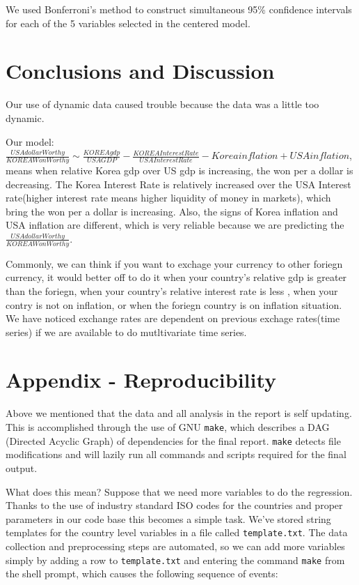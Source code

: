 \documentclass[12pt]{article}
\begin{document}
We used Bonferroni's method to construct simultaneous 95\% confidence intervals
for each of the 5 variables selected in the centered model.

\section{Conclusions and Discussion}

Our use of dynamic data caused trouble because the data was a little too
dynamic.

Our model: $\frac{USA dollar Worthy}{KOREA Won Worthy} \sim \frac{KOREA gdp}{USA GDP} - \frac{KOREA Interest Rate}{USA Interest Rate} -  Korea inflation + USA inflation$, means when relative Korea gdp over US gdp is increasing, the won per a dollar is decreasing. The Korea Interest Rate is relatively increased over the USA Interest rate(higher interest rate means higher liquidity of money in markets), which bring the won per a dollar is increasing. Also, the signs of Korea inflation and USA inflation are different, which is very reliable because we are predicting the $\frac{USA dollar Worthy}{KOREA Won Worthy}$.

Commonly, we can think if you want to exchage your currency to other foriegn currency, it would better off to do it when your country's relative gdp is greater than the foriegn, when your country's relative interest rate is less , when your contry is not on inflation, or when the foriegn country is on inflation situation.
We have noticed exchange rates are dependent on previous exchage rates(time series) if we are available to do mutltivariate time series.

\newpage

\section{Appendix - Reproducibility}

Above we mentioned that the data and all analysis in the report is self 
updating. This is accomplished through the use of GNU \texttt{make}, which
describes a DAG (Directed Acyclic Graph) of dependencies for the final
report. \texttt{make} detects file modifications and will lazily run all
commands and scripts required for the final output.

What does this mean? Suppose that we need more variables to do the
regression. Thanks to the use
of industry standard ISO codes for the countries and proper parameters in
our code base this becomes a simple task.
We've stored string templates for the country level 
variables in a file
called \texttt{template.txt}. The data collection and preprocessing steps
are automated, so we can add more variables simply by adding a row to
\texttt{template.txt} and entering the command \texttt{make} from the shell
prompt, which causes the following sequence of events: 
\end{document}
